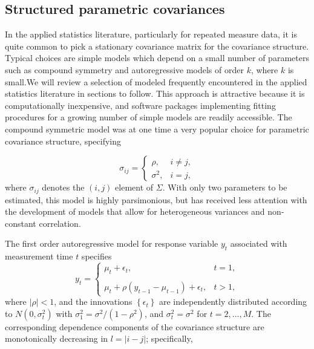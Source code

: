 \documentclass[../chapter-1-introduction.tex]{subfiles}
\begin{document}
\subsection{Structured parametric covariances} \label{parametric-covariance-models}


In the applied statistics literature, particularly for repeated measure data, it is quite common to pick a stationary covariance matrix for the covariance structure. Typical choices are simple models which depend on a small number of parameters such as compound symmetry and autoregressive models of order $k$, where $k$ is small.We will review a selection of modeled frequently encountered in the applied statistics literature in sections to follow. This approach is attractive because it is computationally inexpensive, and software packages implementing fitting procedures for a growing number of simple models are readily accessible. The compound symmetric model was at one time a very popular choice for parametric covariance structure, specifying

\begin{equation}\label{eq:compound-symmetric-model}
\sigma_{ij} = \left\{ \begin{array}{lr}
\rho, & i \ne j,\\
\sigma^2, & i = j, 
\end{array}\right.
\end{equation}
\noindent
where $\sigma_{ij}$ denotes the $\left(i,j\right)$ element of $\Sigma$. With only two parameters to be estimated, this model is highly parsimonious, but has received less attention with the development of models that allow for heterogeneous variances and non-constant correlation. 

\bigskip

The first order autoregressive model for response variable $y_t$ associated with measurement time $t$ specifies
\begin{equation}\label{eq:ar-1-model}
y_{t} = \left\{ \begin{array}{lr}
\mu_t + \epsilon_t, & t = 1,\\
& \\
\mu_t + \rho\left(y_{t-1} - \mu_{t-1}\right) + \epsilon_t, & t > 1,
\end{array}\right.
\end{equation}
\bigskip
\noindent 
where $\vert \rho \vert < 1$, and the innovations $\left\{\epsilon_t\right\}$ are independently distributed according to $N\left(0,\sigma_t^2\right)$ with $\sigma_1^2 = \sigma^2/\left(1-\rho^2\right)$, and $\sigma_t^2 = \sigma^2$ for $t = 2, \dots, M$. The corresponding dependence components of the covariance structure are monotonically decreasing in $l = \vert i-j \vert$; specifically,
\end{document}

